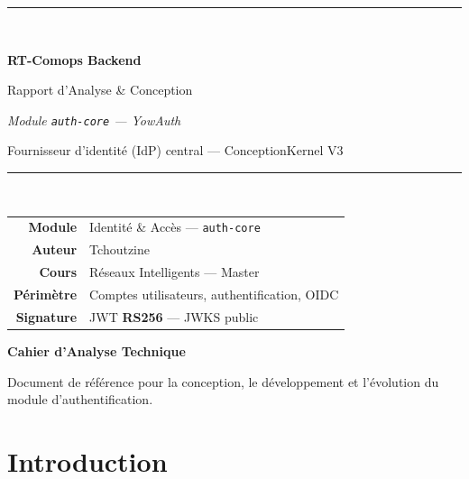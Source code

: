 \documentclass[11pt,a4paper,oneside]{report}
\begin{document}

\begin{titlepage}
\centering
\vspace*{2.2cm}
{\color{rtnavy}\rule{\linewidth}{2pt}}\\[0.6cm]
{\Huge\bfseries\color{rtnavy} RT-Comops Backend\par}
\vspace{0.4cm}
{\LARGE Rapport d'Analyse \& Conception\par}
\vspace{0.2cm}
{\Large\itshape Module \texttt{auth-core} — YowAuth\par}
\vspace{0.3cm}
{\large Fournisseur d'identité (IdP) central — ConceptionKernel V3\par}
\vspace{0.8cm}
{\color{rtnavy}\rule{\linewidth}{0.8pt}}\\[1.2cm]

\begin{tabular}{rl}
\textbf{Module}      & Identité \& Accès — \texttt{auth-core}\\[2pt]
\textbf{Auteur}      & Tchoutzine\\[2pt]
\textbf{Cours}       & Réseaux Intelligents — Master\\[2pt]
\textbf{Périmètre}   & Comptes utilisateurs, authentification, OIDC\\[2pt]
\textbf{Signature}   & JWT \textbf{RS256} — JWKS public\\[2pt]
\end{tabular}

\vfill
{\large\bfseries Cahier d'Analyse Technique\par}
\vspace{0.4cm}
{\color{rtgray}\small Document de référence pour la conception, le développement et l'évolution du module d'authentification.}
\vspace{1.5cm}
\end{titlepage}

\tableofcontents
\cleardoublepage
{}

\chapter{Introduction}
\end{document}
